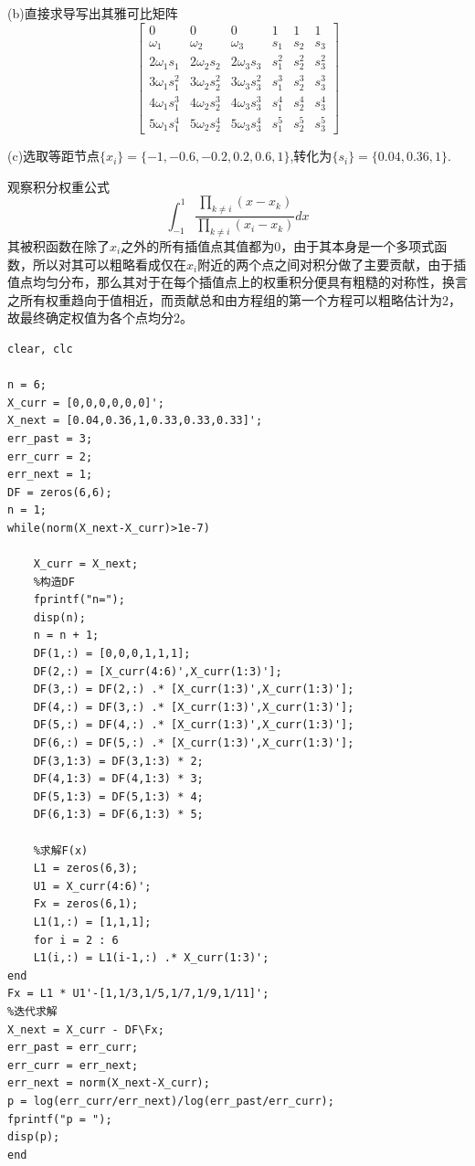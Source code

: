\documentclass[12pt,a4paper,utf8]{ctexart}
\begin{document}
\begin{enumerate}
(b)直接求导写出其雅可比矩阵
\begin{equation}
	\left[\begin{array}{cccccc}
		0 & 0 & 0 & 1 & 1 & 1 \\
		 \omega_1 		&  \omega_2 		&  \omega_3 		& s_1 	& s_2 	& s_3 \\
		2\omega_1 s_1	& 2\omega_2 s_2		& 2\omega_3 s_3		& s_1^2 & s_2^2 & s_3^2 \\
		3\omega_1 s_1^2	& 3\omega_2 s_2^2	& 3\omega_3 s_3^2	& s_1^3 & s_2^3 & s_3^3 \\
		4\omega_1 s_1^3	& 4\omega_2 s_2^3	& 4\omega_3 s_3^3	& s_1^4 & s_2^4 & s_3^4 \\
		5\omega_1 s_1^4	& 5\omega_2 s_2^4	& 5\omega_3 s_3^4	& s_1^5 & s_2^5 & s_3^5
	\end{array}\right]
	\nonumber
\end{equation}

(c)选取等距节点$ \{x_i\} = \{-1,-0.6,-0.2,0.2,0.6,1\} $,转化为$ \{s_i\} = \{0.04,0.36,1\}$.

观察积分权重公式
\begin{equation}
	\int_{-1}^1 \frac{\prod_{k \neq i} (x - x_k)}{\prod_{k \neq i} (x_i - x_k)} dx\nonumber
\end{equation}
其被积函数在除了$ x_i $之外的所有插值点其值都为0，由于其本身是一个多项式函数，所以对其可以粗略看成仅在$ x_i $附近的两个点之间对积分做了主要贡献，由于插值点均匀分布，那么其对于在每个插值点上的权重积分便具有粗糙的对称性，换言之所有权重趋向于值相近，而贡献总和由方程组的第一个方程可以粗略估计为$ 2 $，故最终确定权值为各个点均分$ 2 $。
\begin{lstlisting}[frame=single]
clear, clc

n = 6;
X_curr = [0,0,0,0,0,0]';
X_next = [0.04,0.36,1,0.33,0.33,0.33]';
err_past = 3;
err_curr = 2;
err_next = 1; 
DF = zeros(6,6);
n = 1;
while(norm(X_next-X_curr)>1e-7)

	X_curr = X_next;
	%构造DF
	fprintf("n=");
	disp(n);
	n = n + 1;	
	DF(1,:) = [0,0,0,1,1,1];
	DF(2,:) = [X_curr(4:6)',X_curr(1:3)'];
	DF(3,:) = DF(2,:) .* [X_curr(1:3)',X_curr(1:3)'];
	DF(4,:) = DF(3,:) .* [X_curr(1:3)',X_curr(1:3)'];
	DF(5,:) = DF(4,:) .* [X_curr(1:3)',X_curr(1:3)'];
	DF(6,:) = DF(5,:) .* [X_curr(1:3)',X_curr(1:3)'];
	DF(3,1:3) = DF(3,1:3) * 2;
	DF(4,1:3) = DF(4,1:3) * 3;
	DF(5,1:3) = DF(5,1:3) * 4;
	DF(6,1:3) = DF(6,1:3) * 5;

	%求解F(x)
	L1 = zeros(6,3);
	U1 = X_curr(4:6)';
	Fx = zeros(6,1);
	L1(1,:) = [1,1,1];
	for i = 2 : 6	
	L1(i,:) = L1(i-1,:) .* X_curr(1:3)';
end
Fx = L1 * U1'-[1,1/3,1/5,1/7,1/9,1/11]';
%迭代求解
X_next = X_curr - DF\Fx;
err_past = err_curr;
err_curr = err_next;
err_next = norm(X_next-X_curr);
p = log(err_curr/err_next)/log(err_past/err_curr);
fprintf("p = ");
disp(p);
end


\end{lstlisting}
\end{enumerate}
\end{document}
